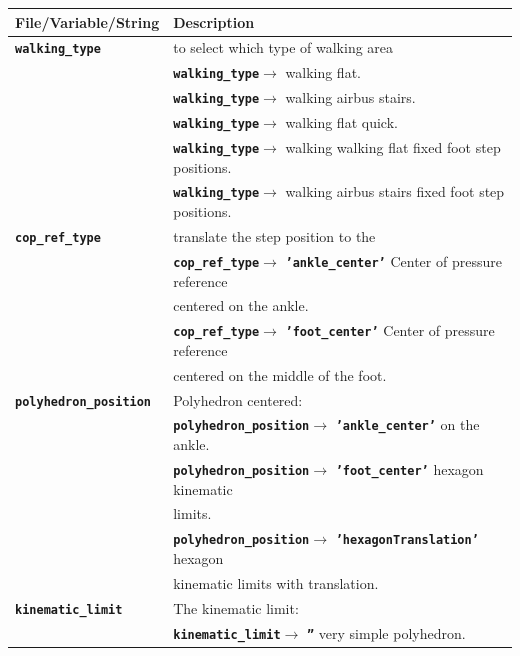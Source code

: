 \documentclass[12pt,oneside,notitlepage,abstracton,a4paper]{scrartcl}
\begin{document}
\begin{table}[!htbp] 
\begin{center}
\begin{tabular}{|l|l|}
  \hline
  \rowcolor{green!25}\bf {\small File/Variable/String}      & \bf {\small Description}  \\ \hline 
  \textbf{\texttt{walking\_type}}          & to select which type of walking area\\ 
             & \textbf{\texttt{walking\_type}}$\rightarrow$ walking flat.\\
             & \textbf{\texttt{walking\_type}}$\rightarrow$ walking airbus stairs.\\
             & \textbf{\texttt{walking\_type}}$\rightarrow$ walking flat quick.\\
             & \textbf{\texttt{walking\_type}}$\rightarrow$ walking walking flat fixed foot step positions.\\
             & \textbf{\texttt{walking\_type}}$\rightarrow$ walking airbus stairs fixed foot step positions.\\   \hline  
  \textbf{\texttt{cop\_ref\_type}}         & translate the step position to the\\
             & \textbf{\texttt{cop\_ref\_type}}$\rightarrow$ \textbf{\texttt{'ankle\_center'}} Center of pressure reference\\
             & centered on the ankle.\\
             & \textbf{\texttt{cop\_ref\_type}}$\rightarrow$ \textbf{\texttt{'foot\_center'}} Center of pressure reference \\                & centered on the middle of the foot.\\   \hline 
  \textbf{\texttt{polyhedron\_position}}         & Polyhedron centered:\\ 
  & \textbf{\texttt{polyhedron\_position}}$\rightarrow$ \textbf{\texttt{'ankle\_center'}} on the ankle.\\ 
  & \textbf{\texttt{polyhedron\_position}}$\rightarrow$ \textbf{\texttt{'foot\_center'}} hexagon kinematic\\ 
  & limits.\\ 
  & \textbf{\texttt{polyhedron\_position}}$\rightarrow$ \textbf{\texttt{'hexagonTranslation'}} hexagon \\
  & kinematic limits with translation.\\ \hline 
  \textbf{\texttt{kinematic\_limit}}         & The kinematic limit:\\
  & \textbf{\texttt{kinematic\_limit}}$\rightarrow$ \textbf{\texttt{''}} very simple polyhedron.\\ 

\end{tabular}
\end{center}
\end{table}
\end{document}
